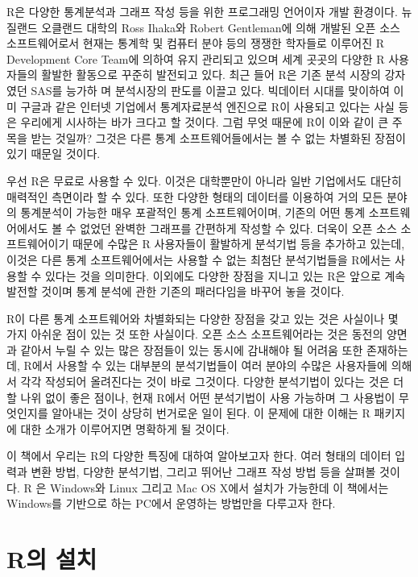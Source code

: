 \documentclass[
]{book}
\begin{document}
R은 다양한 통계분석과 그래프 작성 등을 위한 프로그래밍 언어이자 개발
환경이다. 뉴질랜드 오클랜드 대학의 Ross Ihaka와 Robert Gentleman에 의해
개발된 오픈 소스 소프트웨어로서 현재는 통계학 및 컴퓨터 분야 등의
쟁쟁한 학자들로 이루어진 R Development Core Team에 의하여 유지 관리되고
있으며 세계 곳곳의 다양한 R 사용자들의 활발한 활동으로 꾸준히 발전되고
있다. 최근 들어 R은 기존 분석 시장의 강자였던 SAS를 능가하 며 분석시장의
판도를 이끌고 있다. 빅데이터 시대를 맞이하여 이미 구글과 같은 인터넷
기업에서 통계자료분석 엔진으로 R이 사용되고 있다는 사실 등은 우리에게
시사하는 바가 크다고 할 것이다. 그럼 무엇 때문에 R이 이와 같이 큰 주목을
받는 것일까? 그것은 다른 통계 소프트웨어들에서는 볼 수 없는 차별화된
장점이 있기 때문일 것이다.

우선 R은 무료로 사용할 수 있다. 이것은 대학뿐만이 아니라 일반 기업에서도
대단히 매력적인 측면이라 할 수 있다. 또한 다양한 형태의 데이터를
이용하여 거의 모든 분야의 통계분석이 가능한 매우 포괄적인 통계
소프트웨어이며, 기존의 어떤 통계 소프트웨어에서도 볼 수 없었던 완벽한
그래프를 간편하게 작성할 수 있다. 더욱이 오픈 소스 소프트웨어이기
때문에 수많은 R 사용자들이 활발하게 분석기법 등을 추가하고 있는데, 이것은
다른 통계 소프트웨어에서는 사용할 수 없는 최첨단 분석기법들을 R에서는
사용할 수 있다는 것을 의미한다. 이외에도 다양한 장점을 지니고 있는 R은
앞으로 계속 발전할 것이며 통계 분석에 관한 기존의 패러다임을 바꾸어 놓을
것이다.

R이 다른 통계 소프트웨어와 차별화되는 다양한 장점을 갖고 있는 것은
사실이나 몇 가지 아쉬운 점이 있는 것 또한 사실이다. 오픈 소스
소프트웨어라는 것은 동전의 양면과 같아서 누릴 수 있는 많은 장점들이
있는 동시에 감내해야 될 어려움 또한 존재하는데, R에서 사용할 수 있는
대부분의 분석기법들이 여러 분야의 수많은 사용자들에 의해서 각각 작성되어 올려진다는 것이 바로 그것이다. 다양한 분석기법이 있다는 것은 더할 나위 없이 좋은 점이나, 현재 R에서 어떤 분석기법이 사용 가능하며
그 사용법이 무엇인지를 알아내는 것이 상당히 번거로운 일이 된다. 이 문제에
대한 이해는 R 패키지에 대한 소개가 이루어지면 명확하게 될 것이다.

이 책에서 우리는 R의 다양한 특징에 대하여 알아보고자 한다. 여러 형태의
데이터 입력과 변환 방법, 다양한 분석기법, 그리고 뛰어난 그래프 작성 방법
등을 살펴볼 것이다. R 은 Windows와 Linux 그리고 Mac OS X에서 설치가
가능한데 이 책에서는 Windows를 기반으로 하는 PC에서 운영하는 방법만을
다루고자 한다.

\hypertarget{ruxc758-uxc124uxce58}{%
\section{R의 설치}\label{ruxc758-uxc124uxce58}}
\end{document}

